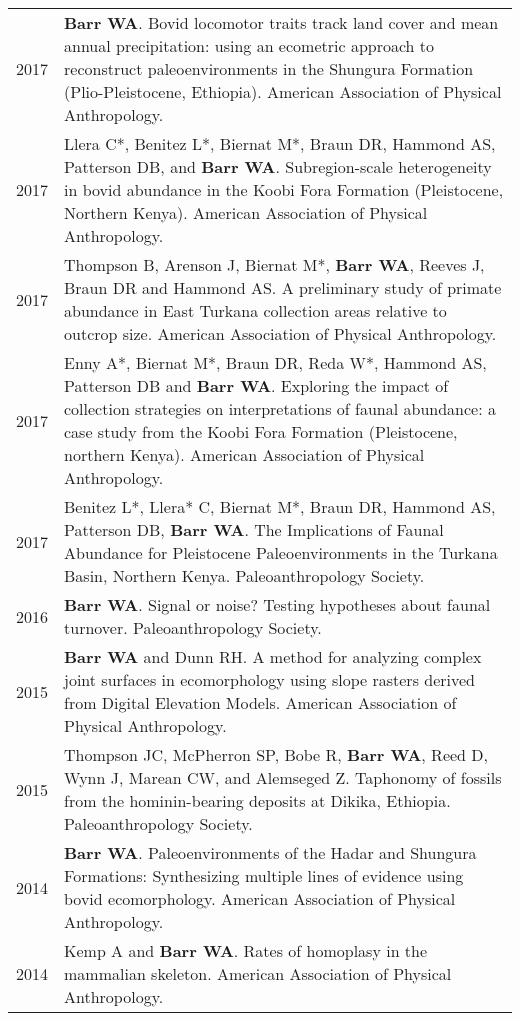 \documentclass{article}
\begin{document}
\begin{longtable}{p{}p{}}
2017 & {\bfseries Barr WA}. Bovid locomotor traits track land cover and mean annual precipitation: using an ecometric approach to reconstruct paleoenvironments in the Shungura Formation (Plio-Pleistocene, Ethiopia). American Association of Physical Anthropology.\\[4pt]
2017 & Llera C*, Benitez L*, Biernat M*, Braun DR,  Hammond AS, Patterson DB, and {\bfseries Barr WA}. Subregion-scale heterogeneity in bovid abundance in the Koobi Fora Formation (Pleistocene, Northern Kenya).  American Association of Physical Anthropology.\\[4pt]
2017 & Thompson B, Arenson J, Biernat M*,  {\bfseries Barr WA}, Reeves J, Braun DR and Hammond AS. A preliminary study of primate abundance in East Turkana collection areas relative to outcrop size. American Association of Physical Anthropology.\\[4pt]
2017 & Enny A*, Biernat M*, Braun DR, Reda W*, Hammond AS, Patterson DB and {\bfseries Barr WA}. Exploring the impact of collection strategies on interpretations of faunal abundance: a case study from the Koobi Fora Formation (Pleistocene, northern Kenya). American Association of Physical Anthropology.\\[4pt]
2017 & Benitez L*, Llera* C, Biernat M*, Braun DR, Hammond AS, Patterson DB, {\bfseries Barr WA}. The Implications of Faunal Abundance for Pleistocene Paleoenvironments in the Turkana Basin, Northern Kenya. Paleoanthropology Society. \\[4pt]

2016 & {\bfseries Barr WA}. Signal or noise? Testing hypotheses about faunal turnover. Paleoanthropology Society. \\[4pt]

2015 & {\bfseries Barr WA} and Dunn RH. A method for analyzing complex joint surfaces in ecomorphology using slope rasters derived from Digital Elevation Models. American Association of Physical Anthropology.\\[4pt]
2015 & Thompson JC, McPherron SP, Bobe R, {\bfseries Barr WA}, Reed D, Wynn J, Marean CW, and Alemseged Z. Taphonomy of fossils from the hominin-bearing deposits at Dikika, Ethiopia. Paleoanthropology Society.\\[4pt]

2014 & {\bfseries Barr WA}. Paleoenvironments of the Hadar and Shungura Formations: Synthesizing multiple lines of evidence using bovid ecomorphology. American Association of Physical Anthropology.\\[4pt]
2014 & Kemp A and {\bfseries Barr WA}. Rates of homoplasy in the mammalian skeleton. American Association of Physical Anthropology.\\[4pt]


\end{longtable}
\end{document}
